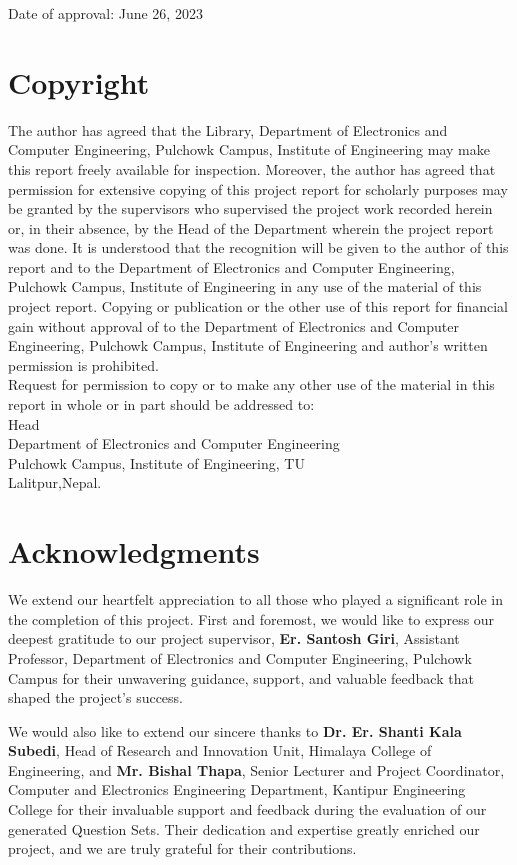 \documentclass[12pt]{report}
\begin{document}
\centerline{Date of approval: June 26, 2023}
\restoregeometry
\chapter*{Copyright}
The author has agreed that the Library, Department of Electronics and Computer Engineering, Pulchowk Campus, Institute of Engineering may make this report freely available for inspection. Moreover, the author has agreed that permission for extensive copying of this project report for scholarly purposes may be granted by the supervisors who supervised the project work recorded herein or, in their absence, by the Head of the Department wherein the project report was done. It is understood that the recognition will be given to the author of this report and to the Department of Electronics and Computer Engineering, Pulchowk Campus, Institute of Engineering in any use of the material of this project report. Copying or publication or the other use of this report for financial gain without approval of to the Department of Electronics and Computer Engineering, Pulchowk Campus, Institute of Engineering and author's written permission is prohibited.\\
Request for permission to copy or to make any other use of the material in this report in whole or in part should be addressed to:\\
\newline
\newline
Head\\
Department of Electronics and Computer Engineering\\
Pulchowk Campus, Institute of Engineering, TU\\
Lalitpur,Nepal.
\chapter*{Acknowledgments}
We extend our heartfelt appreciation to all those who played a significant role in the completion of this project. First and foremost, we would like to express our deepest gratitude to our project supervisor, {\textbf{Er. Santosh Giri}}, Assistant Professor, Department of Electronics and Computer Engineering, Pulchowk Campus for their unwavering guidance, support, and valuable feedback that shaped the project's success.

We would also like to extend our sincere thanks to {\textbf {Dr. Er. Shanti Kala Subedi}}, Head of Research and Innovation Unit, Himalaya College of Engineering, and {\textbf {Mr. Bishal Thapa}}, Senior Lecturer and Project Coordinator, Computer and Electronics Engineering Department, Kantipur Engineering College for their invaluable support and feedback during the evaluation of our generated Question Sets. Their dedication and expertise greatly enriched our project, and we are truly grateful for their contributions.
\end{document}
